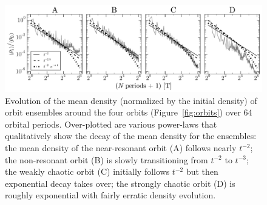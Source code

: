 \documentclass[letterpaper,12pt,preprint]{aastex}
\begin{document}
\clearpage
\begin{figure}[p]
\begin{center}
\includegraphics[width=\textwidth]{figures/ensemble-densities.pdf}
\caption{Evolution of the mean density (normalized by the initial density) of orbit ensembles around the four orbits (Figure~\ref{fig:orbits}) over 64 orbital periods. Over-plotted are various power-laws that qualitatively show the decay of the mean density for the ensembles: the mean density of the near-resonant orbit (A) follows nearly $t^{-2}$; the non-resonant orbit (B) is slowly transitioning from $t^{-2}$ to $t^{-3}$; the weakly chaotic orbit (C) initially follows $t^{-2}$ but then exponential decay takes over; the strongly chaotic orbit (D) is roughly exponential with fairly erratic density evolution. }
\label{fig:densities}
\end{center}
\end{figure}
\end{document}
